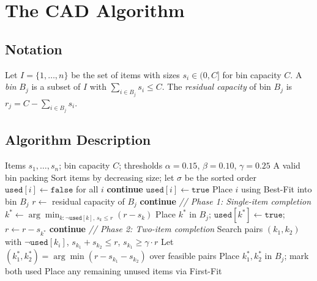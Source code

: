 \documentclass[11pt]{article}
\begin{document}
\section{The CAD Algorithm}

\subsection{Notation}

Let $I = \{1, \ldots, n\}$ be the set of items with sizes $s_i \in (0, C]$ for bin
capacity $C$. A \emph{bin} $B_j$ is a subset of $I$ with $\sum_{i \in B_j} s_i \leq C$.
The \emph{residual capacity} of bin $B_j$ is $r_j = C - \sum_{i \in B_j} s_i$.

\subsection{Algorithm Description}

\begin{algorithm}[H]
\caption{Completion-Aware Decreasing (CAD)}
\label{alg:cad}
\begin{algorithmic}[1]
\Require Items $s_1, \ldots, s_n$; bin capacity $C$; thresholds $\alpha = 0.15$, $\beta = 0.10$, $\gamma = 0.25$
\Ensure A valid bin packing
\State Sort items by decreasing size; let $\sigma$ be the sorted order
\State $\texttt{used}[i] \gets \texttt{false}$ for all $i$
   \textbf{continue} \EndIf
  \State $\texttt{used}[i] \gets \texttt{true}$
  \State Place $i$ using Best-Fit into bin $B_j$
  \State $r \gets$ residual capacity of $B_j$
   \textbf{continue} \EndIf
  \Statex \hspace{\algorithmicindent}\textit{// Phase 1: Single-item completion}
  \State $k^* \gets \arg\min_{k : \neg\texttt{used}[k],\, s_k \leq r} (r - s_k)$
    \State Place $k^*$ in $B_j$; $\texttt{used}[k^*] \gets \texttt{true}$; $r \gets r - s_{k^*}$
  \EndIf
   \textbf{continue} \EndIf
  \Statex \hspace{\algorithmicindent}\textit{// Phase 2: Two-item completion}
  \State Search pairs $(k_1, k_2)$ with $\neg\texttt{used}[k_i]$, $s_{k_1} + s_{k_2} \leq r$, $s_{k_1} \geq \gamma \cdot r$
  \State Let $(k_1^*, k_2^*) = \arg\min (r - s_{k_1} - s_{k_2})$ over feasible pairs
    \State Place $k_1^*, k_2^*$ in $B_j$; mark both used
  \EndIf
\EndFor
\State Place any remaining unused items via First-Fit
\end{algorithmic}
\end{algorithm}
\end{document}
